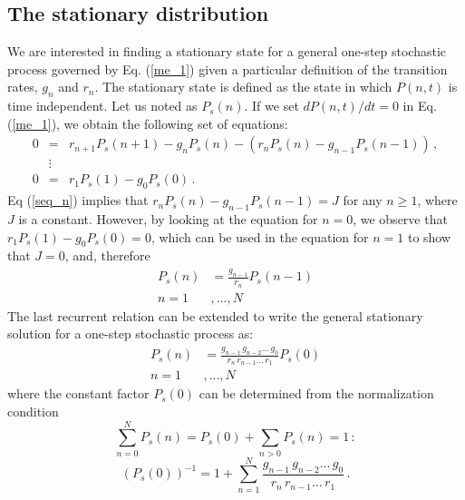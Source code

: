 \subsection{The stationary distribution}
\label{stationary_distribution}
We are interested in finding a stationary state for a general one-step stochastic process governed by Eq. (\ref{me_1}) given a particular definition of the transition rates, $g_n$ and $r_n$. The stationary state is defined as the state in which $P(n, t)$ is time independent. Let us noted as $P_s(n)$. If we set $dP(n,t)/dt=0$ in Eq. (\ref{me_1}), we obtain the following set of equations:
\begin{eqnarray}
\label{seq_n}
0 & = & r_{n+1} P_s(n+1) - g_n P_s(n) - (r_n P_s(n) - g_{n-1} P_s(n-1))\,, \\
&\vdots& \nonumber\\
\label{seq_0}
0 & = & r_{1} P_s(1) - g_0 P_s(0)\,.
\end{eqnarray}
Eq (\ref{seq_n}) implies that $r_n P_s(n) - g_{n-1} P_s(n-1) = J$ for any $n \ge 1$, where $J$ is a constant. However, by looking at the equation for $n=0$, we observe that $r_{1} P_s(1) - g_0 P_s(0) = 0$, which can be used in the equation for $n=1$ to show that $J = 0$, and, therefore 
\begin{align}
P_s(n) &= \frac{g_{n-1}}{r_n} P_s(n-1)\nonumber\\
   n =1&,...,N     
\label{balance}
\end{align}
The last recurrent relation can be extended to write the general stationary solution for a one-step stochastic process as: 
\begin{align}
P_s(n)      &= \frac{g_{n-1}\, g_{n-2} ...\, g_0}{r_n\, r_{n-1} ...\, r_1} P_s(0)\nonumber\\
        n =1&,...,N    
\label{P_stationary}
\end{align}
where the constant factor $P_s(0)$ can be determined from the normalization condition
\begin{equation}
\sum_{n=0}^N P_s(n) = P_s(0) + \sum_{n>0} P_s(n) = 1\, :
\label{Norma}
\end{equation}
\begin{equation}
(P_s(0))^{-1} = 1 + \sum_{n=1}^{N} \frac{g_{n-1}\, g_{n-2} ...\, g_0}{r_n\, 
	r_{n-1} ...\, r_1}\, .  
\label{inversionPs(0)}
\end{equation}

